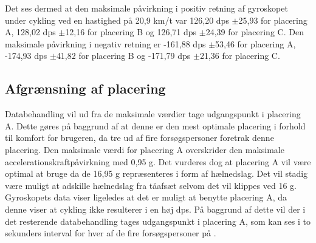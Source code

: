 \begin{table}[H]
	\centering
	\caption{I tabellen ses de maksimale positive og negative værdier fra gyroskopets z-akse som resultat af cykling med en hastighed på 20,9 km/t. Værdierne er fundet for både placering A, B og C.}
	\label{fig:Ap_maxghastighed}
\end{table}
Det ses dermed at den maksimale påvirkning i positiv retning af gyroskopet under cykling ved en hastighed på 20,9 km/t var 126,20 dps $\pm$25,93 for placering A, 128,02 dps $\pm$12,16 for placering B og 126,71 dps $\pm$24,39 for placering C. 
Den maksimale påvirkning i negativ retning er -161,88 dps $\pm$53,46 for placering A, -174,93 dps $\pm$41,82 for placering B og -171,79 dps $\pm$21,36 for placering C. 

\subsection{Afgrænsning af placering}
Databehandling vil ud fra de maksimale værdier tage udgangspunkt i placering A. Dette gøres på baggrund af at denne er den mest optimale placering i forhold til komfort for brugeren, da tre ud af fire forsøgspersoner foretrak denne placering. Den maksimale værdi for placering A overskrider den maksimale accelerationskraftpåvirkning med 0,95 g. Det vurderes dog at placering A vil være optimal at bruge da de 16,95 g repræsenteres i form af hælnedslag. Det vil stadig være muligt at adskille hælnedslag fra tåafsæt selvom det vil klippes ved 16 g. \newline
Gyroskopets data viser ligeledes at det er muligt at benytte placering A, da denne viser at cykling ikke resulterer i en høj dps. 
På baggrund af dette vil der i det resterende databehandling tages udgangspunkt i placering A, som kan ses i to sekunders interval for hver af de fire forsøgspersoner på .

